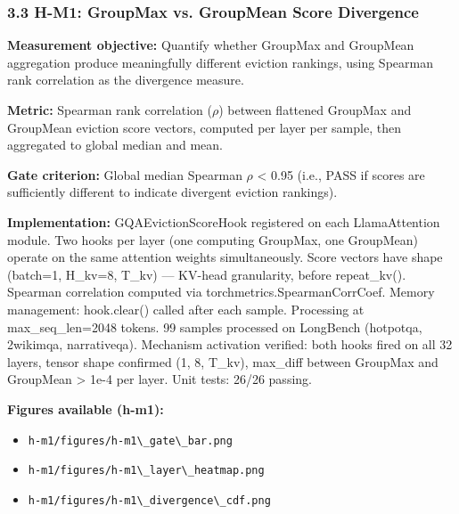 \subsubsection{3.3 H-M1: GroupMax vs. GroupMean Score Divergence}

\textbf{Measurement objective:} Quantify whether GroupMax and GroupMean aggregation produce meaningfully different eviction rankings, using Spearman rank correlation as the divergence measure.

\textbf{Metric:} Spearman rank correlation ($\rho$) between flattened GroupMax and GroupMean eviction score vectors, computed per layer per sample, then aggregated to global median and mean.

\textbf{Gate criterion:} Global median Spearman $\rho$ < 0.95 (i.e., PASS if scores are sufficiently different to indicate divergent eviction rankings).

\textbf{Implementation:} GQAEvictionScoreHook registered on each LlamaAttention module. Two hooks per layer (one computing GroupMax, one GroupMean) operate on the same attention weights simultaneously. Score vectors have shape (batch=1, H\_kv=8, T\_kv) --- KV-head granularity, before repeat\_kv(). Spearman correlation computed via torchmetrics.SpearmanCorrCoef. Memory management: hook.clear() called after each sample. Processing at max\_seq\_len=2048 tokens. 99 samples processed on LongBench (hotpotqa, 2wikimqa, narrativeqa). Mechanism activation verified: both hooks fired on all 32 layers, tensor shape confirmed (1, 8, T\_kv), max\_diff between GroupMax and GroupMean > 1e-4 per layer. Unit tests: 26/26 passing.

\textbf{Figures available (h-m1):}
\begin{itemize}
\item \texttt{h-m1/figures/h-m1\textbackslash \_gate\textbackslash \_bar.png}
\item \texttt{h-m1/figures/h-m1\textbackslash \_layer\textbackslash \_heatmap.png}
\item \texttt{h-m1/figures/h-m1\textbackslash \_divergence\textbackslash \_cdf.png}
\end{itemize}

